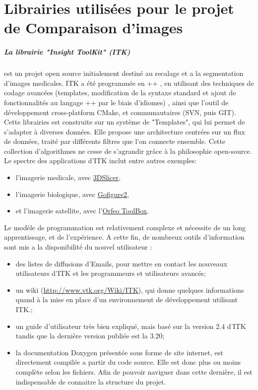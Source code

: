 


\chapter{Librairies utilisées pour le projet de Comparaison d'images}


\paragraph{La librairie "Insight ToolKit" (ITK)} est un projet open source initialement destiné au recalage et a la segmentation d'images medicales. ITK a été programmée en \C++ , en utilisant des techniques de codage avancées (templates, modification de la syntaxe standard et ajout de fonctionnalités au langage \C++ par le biais d'idiomes) , ainsi que l'outil de développement cross-platform CMake, et communautaires (SVN, puis GIT). 
Cette librairies est construite sur un système de "Templates", qui lui permet de s'adapter à diverses données. Elle propose une architecture centrées sur un flux de données, traité par différents filtres que l'on connecte ensemble.
Cette collection d'algorithmes ne cesse de s'agrandir grâce à la philosophie open-source. Le spectre des applications d'ITK inclut entre autres exemples:  
\begin{itemize}
  \item l'imagerie medicale, avec \href{http://www.slicer.org/}{3DSlicer},
  \item l'imagerie biologique, avec \href{http://gofigure2.sourceforge.net/}{Gofigure2},
  \item et l'imagerie satellite, avec l'\href{http://www.orfeo-toolbox.org/otb/}{Orfeo ToolBox}.
\end{itemize}
Le modèle de programmation est relativement complexe et nécessite de un long apprentissage, et de l'expérience. A cette fin, de nombreux outils d'information sont mis a la disponibilité du nouvel utilisateur :
\begin{itemize}
  \item des listes de diffusions d'Emails, pour mettre en contact les nouveaux utilisateurs d'ITK et les programmeurs et utilisateurs avancés;
  \item un wiki (\url{http://www.vtk.org/Wiki/ITK}), qui donne quelques informations quand à la mise en place d'un environnement de développement utilisant ITK.;
  \item un guide d'utilisateur très bien expliqué, mais basé sur la version 2.4 d'ITK tandis que la dernière version publiée est la 3.20;
  \item la documentation Doxygen présentée sous forme de site internet, est directement compilée a partir du code source. Elle est donc plus ou moins complète selon les fichiers. Afin de pouvoir naviguer dans cette dernière, il est indispensable de connaitre la structure du projet.
\end{itemize}
